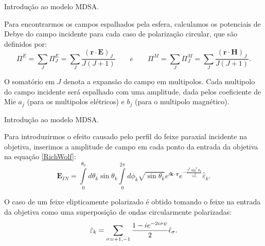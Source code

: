 \documentclass[10pt]{beamer}
\begin{document}
\begin{frame}[fragile]{Introdução ao modelo MDSA.}

    \begin{center}
        Para encontrarmos os campos espalhados pela esfera, calculamos os potenciais de Debye do campo incidente para cada caso de polarização circular, que são definidos por:
        \begin{equation}
        \Pi^{E}=\sum\limits_{J} \Pi^{E}_J=\sum\limits_{J}\frac{ ({\mathbf r}\cdot{\mathbf E })_J }{J(J+1)} \qquad e\qquad \Pi^{M}=\sum\limits_{J} \Pi^{M}_J=\sum\limits_{J}\frac{ ({\mathbf r}\cdot{\mathbf H })_J }{J(J+1)} .
        \end{equation}

        O somatório em $J$ denota a expansão do campo em multipolos. Cada multipolo do campo incidente será espalhado com uma amplitude, dada pelos coeficiente de Mie $a_j$ (para os multipolos elétricos) e $b_j$ (para o multipolo magnético).

    \end{center}

\end{frame}

\begin{frame}[fragile]{Introdução ao modelo MDSA.}

    \begin{center}
        Para introduzirmos o efeito causado pelo perfil do feixe paraxial incidente na objetiva, inserimos a amplitude de campo em cada ponto da entrada da objetiva na equação \ref{RichWolf}:
        \begin{equation}
        \mathbf{E}_{IN}=\int\limits_0^{\theta_0} d\theta_k \sin\theta_k \int\limits_0^{2\pi} d\phi_k\sqrt{\sin\theta_k} e^{i\mathbf{k}\cdot\mathbf{r}} e^{-\frac{f^2\sin^2\theta_k}{\omega_0^2}} \hat{\varepsilon}_k.        
        \end{equation}

        O caso de um feixe elipticamente polarizado é obtido tomando o feixe na entrada da objetiva como uma superposição de ondas circularmente polarizadas:
        \begin{equation}
        \hat{\varepsilon}_k = \sum \limits_{\sigma = +1,-1} \frac{1 - ie^{-2i\sigma \psi}}{2} \hat{\bf{\epsilon}}_\sigma .     
        \end{equation}

    \end{center}

\end{frame}
\end{document}
